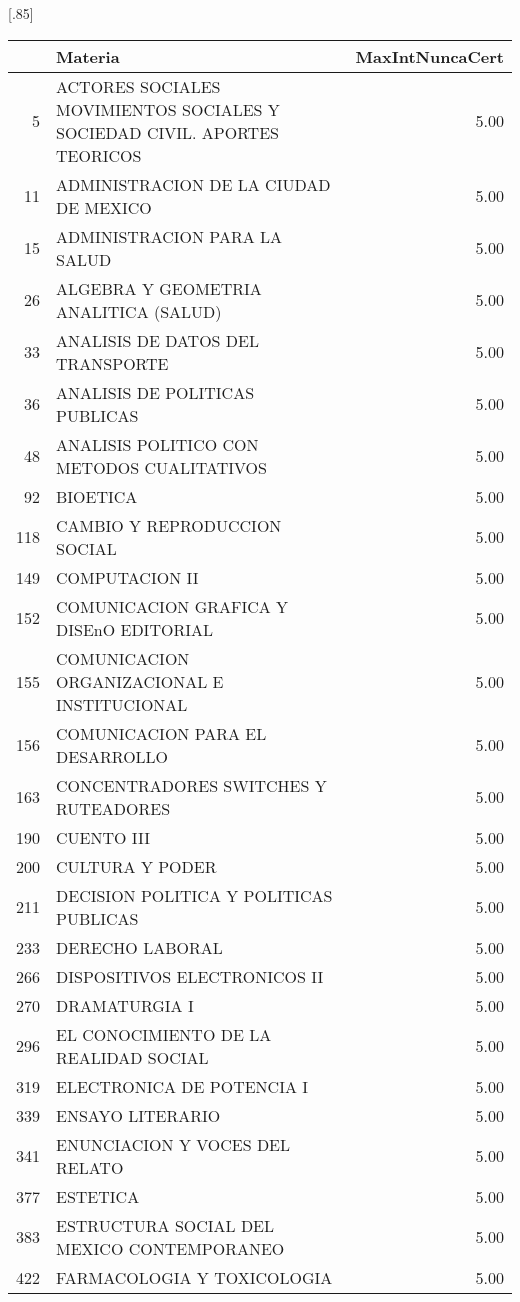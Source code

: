 \documentclass[12pt]{article}
\begin{document}
\begin{table}[ht]
\centering
\scalebox{0.75}[.85]{
\begin{tabular}{rlr}
  \hline
 & Materia & MaxIntNuncaCert \\ 
  \hline
 5 & ACTORES SOCIALES MOVIMIENTOS SOCIALES Y SOCIEDAD CIVIL. APORTES TEORICOS & 5.00 \\ 
  11 & ADMINISTRACION DE LA CIUDAD DE MEXICO & 5.00 \\ 
  15 & ADMINISTRACION PARA LA SALUD & 5.00 \\ 
  26 & ALGEBRA Y GEOMETRIA ANALITICA (SALUD) & 5.00 \\ 
  33 & ANALISIS DE DATOS DEL TRANSPORTE & 5.00 \\ 
  36 & ANALISIS DE POLITICAS PUBLICAS & 5.00 \\ 
  48 & ANALISIS POLITICO CON METODOS CUALITATIVOS & 5.00 \\ 
  92 & BIOETICA & 5.00 \\ 
  118 & CAMBIO Y REPRODUCCION SOCIAL & 5.00 \\ 
  149 & COMPUTACION II & 5.00 \\ 
  152 & COMUNICACION GRAFICA Y DISEnO EDITORIAL & 5.00 \\ 
  155 & COMUNICACION ORGANIZACIONAL E INSTITUCIONAL & 5.00 \\ 
  156 & COMUNICACION PARA EL DESARROLLO & 5.00 \\ 
  163 & CONCENTRADORES SWITCHES Y RUTEADORES & 5.00 \\ 
  190 & CUENTO III & 5.00 \\ 
  200 & CULTURA Y PODER & 5.00 \\ 
  211 & DECISION POLITICA Y POLITICAS PUBLICAS & 5.00 \\ 
  233 & DERECHO LABORAL & 5.00 \\ 
  266 & DISPOSITIVOS ELECTRONICOS II & 5.00 \\ 
  270 & DRAMATURGIA I & 5.00 \\ 
  296 & EL CONOCIMIENTO DE LA REALIDAD SOCIAL & 5.00 \\ 
  319 & ELECTRONICA DE POTENCIA I & 5.00 \\ 
  339 & ENSAYO LITERARIO & 5.00 \\ 
  341 & ENUNCIACION Y VOCES DEL RELATO & 5.00 \\ 
  377 & ESTETICA & 5.00 \\ 
  383 & ESTRUCTURA SOCIAL DEL MEXICO CONTEMPORANEO & 5.00 \\ 
  422 & FARMACOLOGIA Y TOXICOLOGIA & 5.00 \\ 

\end{tabular}}
\end{table}
\end{document}
